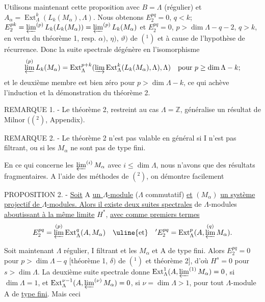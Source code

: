 Utilisons maintenant cette proposition avec $B=\Lambda$ (régulier) et $A_{\alpha}=\operatorname{Ext}_{\Lambda}^{k}(L_k(M_{\alpha}),\Lambda)$. Nous obtenons $E_2^{pq}=0$, $q<k$;
$E_2^{pk}=\varprojlim^{(p)}L_k(L_k(M_{\alpha}))=\varprojlim^{(p)}L_k(M_{\alpha})$ et $E_2^{pq}=0$, $p>\dim\Lambda-q-2$, $q>k$, en vertu du théorème 1, resp. $\alpha)$, $\eta)$, $\vartheta)$ de $(^{1})$ et à cause de l'hypothèse de récurrence. Donc la suite spectrale dégénère en l'isomorphisme
\[
\varprojlim^{(p)}L_k(M_{\alpha})=\operatorname{Ext}_{\Lambda}^{p+k}(\varinjlim\operatorname{Ext}_{\Lambda}^{k}(L_k(M_{\alpha}),\Lambda),\Lambda)\quad\text{pour }p\geq\dim\Lambda-k;
\]
et le  deuxième membre est bien zéro pour $p>\dim\Lambda-k$, ce qui achève l'induction et la démonstration du théorème 2.

REMARQUE 1. - Le théorème 2, restreint au cas $\Lambda=\mathbb Z$, généralise un résultat de Milnor ($(^{2})$, Appendix).

REMARQUE 2. - Le théorème 2 n'est pas valable en général si I n'est pas filtrant, ou si les $M_{\alpha}$ ne sont pas de type fini.

En ce qui concerne les $\varprojlim^{(i)}M_{\alpha}$ avec $i\leq\dim\Lambda$, nous n'avons que des résultats fragmentaires. A l'aide des méthodes de $(^{2})$, on démontre facilement

PROPOSITION 2. - \uline{Soit} A \uline{un $\Lambda$-module} ($\Lambda$ commutatif) \uline{et} $(M_{\alpha})$ \uline{un système projectif de $\Lambda$-modules. Alors il existe deux suites spectrales} de $\Lambda$-modules \uline{aboutissant à la même limite} $H^{*}$, \uline{avec comme premiers termes}
\[
E_2^{pq}=\varprojlim^{(p)}\operatorname{Ext}_{\Lambda}^{q}(A,M_{\alpha})\quad\uline{\text{et}}\quad {}'E_2^{pq}=\operatorname{Ext}_{\Lambda}^{p}(A,\varprojlim^{(q)}M_{\alpha}).
\]

Soit maintenant $\Lambda$ régulier, I filtrant et les $M_{\alpha}$ et A de type fini. Alors $E_2^{pq}=0$ pour $p>\dim\Lambda-q$ [théorème 1, $\delta)$ de $(^{1})$ et théorème 2], d'où $H^s=0$ pour $s>\dim\Lambda$. La deuxième suite spectrale donne $\operatorname{Ext}_{\Lambda}^{1}(A,\varprojlim^{(1)}M_{\alpha})=0$, si $\dim\Lambda=1$, et $\operatorname{Ext}_{\Lambda}^{\nu-1}(A,\varprojlim^{(\nu)}M_{\alpha})=0$, si $\nu=\dim\Lambda>1$, pour tout $\Lambda$-module A de \uline{type fini}. Mais ceci

